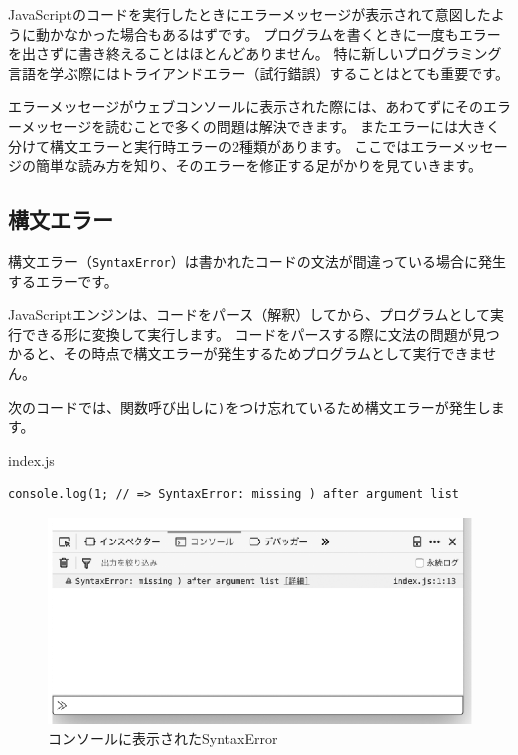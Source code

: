 JavaScriptのコードを実行したときにエラーメッセージが表示されて意図したように動かなかった場合もあるはずです。
プログラムを書くときに一度もエラーを出さずに書き終えることはほとんどありません。
特に新しいプログラミング言語を学ぶ際にはトライアンドエラー（試行錯誤）することはとても重要です。

エラーメッセージがウェブコンソールに表示された際には、あわてずにそのエラーメッセージを読むことで多くの問題は解決できます。
またエラーには大きく分けて構文エラーと実行時エラーの2種類があります。
ここではエラーメッセージの簡単な読み方を知り、そのエラーを修正する足がかりを見ていきます。

\hypertarget{syntax-error}{%
\subsection{構文エラー}\label{syntax-error}}

構文エラー（\texttt{SyntaxError}）は書かれたコードの文法が間違っている場合に発生するエラーです。

JavaScriptエンジンは、コードをパース（解釈）してから、プログラムとして実行できる形に変換して実行します。
コードをパースする際に文法の問題が見つかると、その時点で構文エラーが発生するためプログラムとして実行できません。

次のコードでは、関数呼び出しに\texttt{)}をつけ忘れているため構文エラーが発生します。

\begin{listtitle}
index.js
\end{listtitle}
\begin{lstlisting}
console.log(1; // => SyntaxError: missing ) after argument list
\end{lstlisting}
\listend

\begin{figure}
\centering
\includegraphics[width=140mm]{./fig/syntax-error.eps}
\caption{コンソールに表示されたSyntaxError}
\end{figure}

